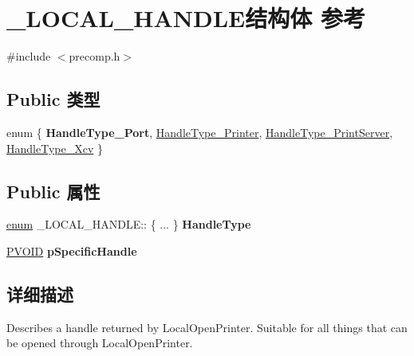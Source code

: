 \hypertarget{struct___l_o_c_a_l___h_a_n_d_l_e}{}\section{\+\_\+\+L\+O\+C\+A\+L\+\_\+\+H\+A\+N\+D\+L\+E结构体 参考}
\label{struct___l_o_c_a_l___h_a_n_d_l_e}


{\ttfamily \#include $<$precomp.\+h$>$}

\subsection*{Public 类型}
\begin{DoxyCompactItemize}
\item 
enum \{ {\bfseries Handle\+Type\+\_\+\+Port}, 
\hyperlink{struct___l_o_c_a_l___h_a_n_d_l_e_a14e5d81bdea06d5e28f43d54d09955e1aa5f4c93e1495c27654f78f455f6db911}{Handle\+Type\+\_\+\+Printer}, 
\hyperlink{struct___l_o_c_a_l___h_a_n_d_l_e_a14e5d81bdea06d5e28f43d54d09955e1a00a7df71485cf642cbb4fff21fd34715}{Handle\+Type\+\_\+\+Print\+Server}, 
\hyperlink{struct___l_o_c_a_l___h_a_n_d_l_e_a14e5d81bdea06d5e28f43d54d09955e1a77ecd040e3731f0a65b72d349a52252c}{Handle\+Type\+\_\+\+Xcv}
 \}
\end{DoxyCompactItemize}
\subsection*{Public 属性}
\begin{DoxyCompactItemize}
\item 
\mbox{\label{struct___l_o_c_a_l___h_a_n_d_l_e_a5f1e9fd2273058e596ee083815c37faf}} 
\hyperlink{interfaceenum}{enum} \+\_\+\+L\+O\+C\+A\+L\+\_\+\+H\+A\+N\+D\+L\+E\+:: \{ ... \}  {\bfseries Handle\+Type}
\item 
\mbox{\label{struct___l_o_c_a_l___h_a_n_d_l_e_aee91297b2aa1adb196c2315a3bfb352a}} 
\hyperlink{interfacevoid}{P\+V\+O\+ID} {\bfseries p\+Specific\+Handle}
\end{DoxyCompactItemize}


\subsection{详细描述}
Describes a handle returned by Local\+Open\+Printer. Suitable for all things that can be opened through Local\+Open\+Printer. 

